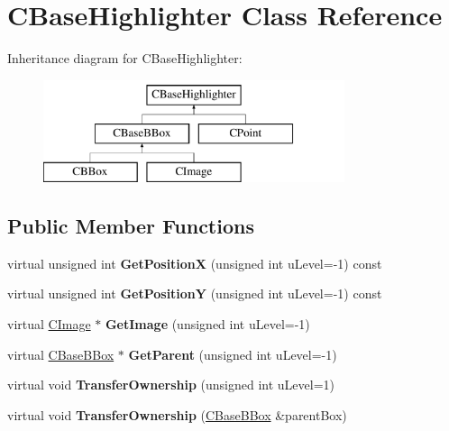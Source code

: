 \hypertarget{class_c_base_highlighter}{}\section{C\+Base\+Highlighter Class Reference}
\label{class_c_base_highlighter}
Inheritance diagram for C\+Base\+Highlighter\+:\begin{figure}[H]
\begin{center}
\leavevmode
\includegraphics[height=3.000000cm]{class_c_base_highlighter}
\end{center}
\end{figure}
\subsection*{Public Member Functions}
\begin{DoxyCompactItemize}
\item 
\mbox{\label{class_c_base_highlighter_acd04321a5f64f77d59a37a2f0ca235fb}} 
virtual unsigned int {\bfseries Get\+PositionX} (unsigned int u\+Level=-\/1) const
\item 
\mbox{\label{class_c_base_highlighter_a382ec7cbb665e220dedc4473d6725998}} 
virtual unsigned int {\bfseries Get\+PositionY} (unsigned int u\+Level=-\/1) const
\item 
\mbox{\label{class_c_base_highlighter_a770796fc3ef5afe56b71ea02f711740d}} 
virtual \hyperlink{class_c_image}{C\+Image} $\ast$ {\bfseries Get\+Image} (unsigned int u\+Level=-\/1)
\item 
\mbox{\label{class_c_base_highlighter_a6d1d5b8b30a52c78bc50e3968a0d7907}} 
virtual \hyperlink{class_c_base_b_box}{C\+Base\+B\+Box} $\ast$ {\bfseries Get\+Parent} (unsigned int u\+Level=-\/1)
\item 
\mbox{\label{class_c_base_highlighter_a72f841d27775ea6d9a32279748490e90}} 
virtual void {\bfseries Transfer\+Ownership} (unsigned int u\+Level=1)
\item 
\mbox{\label{class_c_base_highlighter_a23bdfc98cb2cffc9f3125d34f77c31fa}} 
virtual void {\bfseries Transfer\+Ownership} (\hyperlink{class_c_base_b_box}{C\+Base\+B\+Box} \&parent\+Box)
\end{DoxyCompactItemize}

